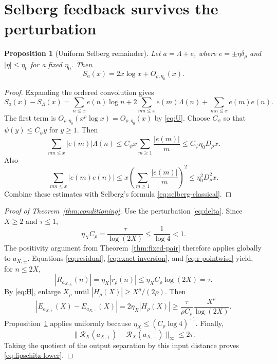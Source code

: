 \documentclass[11pt,a4paper]{amsart}
\newtheorem{proposition}[theorem]{Proposition}
\theoremstyle{definition}
\newcommand{\1}{\mathbf 1}
\begin{document}
\section{Selberg feedback survives the perturbation}\label{sec:selberg}

\begin{proposition}[Uniform Selberg remainder]\label{prop:selberg}
Let $a=\Lambda+e$, where $e=\pm\eta\delta_\rho$ and $|\eta|\le\eta_0$ for a fixed $\eta_0$.  Then
\begin{equation}\label{eq:selberg-perturbed}
 S_a(x)=2x\log x+O_{\rho,\eta_0}(x).
\end{equation}
\end{proposition}

\begin{proof}
Expanding the ordered convolution gives
\begin{equation}\label{eq:S-difference}
 S_a(x)-S_\Lambda(x)
 =\sum_{n\le x}e(n)\log n
 +2\sum_{mn\le x}e(m)\Lambda(n)
 +\sum_{mn\le x}e(m)e(n).
\end{equation}
The first term is $O_{\rho,\eta_0}(x^\rho\log x)=O_{\rho,\eta_0}(x)$ by \eqref{eq:U}.  Choose $C_\psi$ so that $\psi(y)\le C_\psi y$ for $y\ge1$.  Then
\[
 \sum_{mn\le x}|e(m)|\Lambda(n)
 \le C_\psi x\sum_{m\ge1}\frac{|e(m)|}{m}
 \le C_\psi\eta_0D_\rho x.
\]
Also
\[
 \sum_{mn\le x}|e(m)e(n)|
 \le x\left(\sum_{m\ge1}\frac{|e(m)|}{m}\right)^2
 \le\eta_0^2D_\rho^2x.
\]
Combine these estimates with Selberg's formula \eqref{eq:selberg-classical}.
\end{proof}

\begin{proof}[Proof of Theorem~\ref{thm:conditioning}]
Use the perturbation \eqref{eq:delta}.  Since $X\ge2$ and $\tau\le1$,
\[
 \eta_XC_\rho=\frac{\tau}{\log(2X)}\le\frac1{\log4}<1.
\]
The positivity argument from Theorem~\ref{thm:fixed-pair} therefore applies globally to $a_{X,\pm}$.  Equations \eqref{eq:residual}, \eqref{eq:exact-inversion}, and \eqref{eq:r-pointwise} yield, for $n\le2X$,
\[
 |R_{a_{X,\pm}}(n)|
 =\eta_X|r_\rho(n)|
 \le\eta_XC_\rho\log(2X)=\tau.
\]
By \eqref{eq:H}, enlarge $X_\rho$ until
$|H_\rho(X)|\ge X^\rho/(2\rho)$.  Then
\[
 |E_{a_{X,+}}(X)-E_{a_{X,-}}(X)|
 =2\eta_X|H_\rho(X)|
 \ge\frac{\tau}{\rho C_\rho}\frac{X^\rho}{\log(2X)}.
\]
Proposition~\ref{prop:selberg} applies uniformly because
$\eta_X\le(C_\rho\log4)^{-1}$.  Finally,
\[
 \|\mathcal R_X(a_{X,+})-\mathcal R_X(a_{X,-})\|_\infty
 \le2\tau.
\]
Taking the quotient of the output separation by this input distance proves
\eqref{eq:lipschitz-lower}.
\end{proof}
\end{document}
